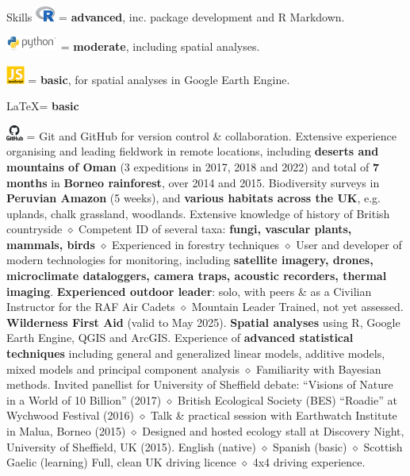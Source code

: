 
\begin{rubric}{Skills}
    \includegraphics[height=0.5cm]{Rlogo.png} = \textbf {advanced}, inc. package development and R Markdown.
    \par \includegraphics[height=0.5cm]{python-logo.png} = \textbf{moderate}, including spatial analyses.
    \par \includegraphics[height=0.6cm]{javascript-logo.jpg} = \textbf{basic}, for spatial analyses in Google Earth Engine.
    \par \LaTeX = \textbf{basic}
    \par \includegraphics[height=0.5cm]{github-logo.png} = Git and GitHub for version control \& collaboration.
\entry*[Fieldwork]
	Extensive experience organising and leading fieldwork in remote locations, including \textbf{deserts and mountains of Oman} (3 expeditions in 2017, 2018 and 2022) and total of \textbf{7 months} in \textbf{Borneo rainforest}, over 2014 and 2015. Biodiversity surveys in \textbf{Peruvian Amazon} (5 weeks), and \textbf{various habitats across the UK}, e.g. uplands, chalk grassland, woodlands.
 Extensive knowledge of history of British countryside $\diamond$ Competent ID of several taxa: \textbf{fungi, vascular plants, mammals, birds} $\diamond$ Experienced in forestry techniques $\diamond$ User and developer of modern technologies for monitoring, including \textbf{satellite imagery, drones, microclimate dataloggers, camera traps, acoustic recorders, thermal imaging}.
 \textbf{Experienced outdoor leader}: solo, with peers \& as a Civilian Instructor for the RAF Air Cadets $\diamond$ Mountain Leader Trained, not yet assessed.
	\textbf{Wilderness First Aid} (valid to May 2025).
\entry*[GIS]
	\textbf{Spatial analyses} using R, Google Earth Engine, QGIS and ArcGIS.
	Experience of \textbf{advanced statistical techniques} including general and generalized linear models, additive models, mixed models and principal component analysis $\diamond$ Familiarity with Bayesian methods.
	Invited panellist for University of Sheffield debate: ``Visions of Nature in a World of 10 Billion'' (2017) $\diamond$ British Ecological Society (BES) ``Roadie'' at Wychwood Festival (2016) $\diamond$ Talk \& practical session with Earthwatch Institute in Malua, Borneo (2015) $\diamond$ Designed and hosted ecology stall at Discovery Night, University of Sheffield, UK (2015).
\entry*[Languages]
	English (native) $\diamond$ Spanish (basic) $\diamond$ Scottish Gaelic (learning)
\entry*[Driving]
	Full, clean UK driving licence $\diamond$ 4x4 driving experience.
\end{rubric}
